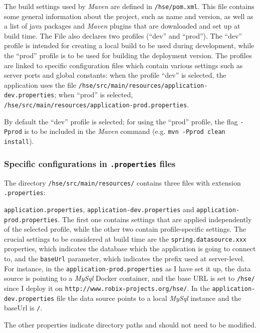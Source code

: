 \documentclass[fleqn]{article}
\begin{document}
The build settings used by \emph{Maven} are defined in \texttt{/hse/pom.xml}. This file contains some general information
about the project, such as name and version, as well as a list of java packages and \emph{Maven} plugins that are 
downloaded and set up at build time. The File also declares two profiles (``dev'' and ``prod''). The ``dev'' profile 
is intended for creating a local build to be used during development, while the ``prod'' profile is to be used for building the deployment version.
The profiles are linked to specific configuration files which contain various settings such as server ports and global
constants: when the profile ``dev'' is selected, the application uses the file \texttt{/hse/src/main/resources/application-dev.properties};
when ``prod'' is selected, \texttt{/hse/src/main/resources/application-prod.properties}. 

By default the ``dev'' profile is selected;
for using the ``prod'' profile, the flag \texttt{-Pprod} is to be included in the \emph{Maven} command 
(e.g. \texttt{mvn -Pprod clean install}).

\subsubsection{Specific configurations in \texttt{.properties} files}

The directory \texttt{/hse/src/main/resources/} contains three files with extension \texttt{.properties}:

\texttt{application.properties}, \texttt{application-dev.properties} and \texttt{application-prod.properties}.
The first one contains settings that are applied independently of the selected profile, while the other
two contain profile-specific settings. The crucial settings to be considered at build time are the 
\texttt{spring.datasource.xxx} properties, which indicates the database which the application is going to connect to, and 
the \texttt{baseUrl} parameter, which indicates the prefix used at server-level.
For instance, in the \texttt{application-prod.properties} as I have set it up, the data source is pointing to a \emph{MySql} Docker container,
and the base URL is set to \texttt{/hse/} since I deploy it on \texttt{http://www.robix-projects.org/hse/}. 
In the \texttt{application-dev.properties} file the data source points to a local \emph{MySql} instance and the baseUrl is \texttt{/}.

The other properties indicate directory paths and should not need to be modified.
\end{document}
